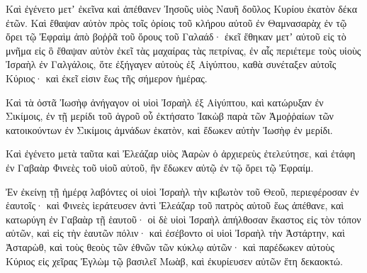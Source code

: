 {\par }{\PP {}Καὶ ἐγένετο μετʼ ἐκεῖνα καὶ ἀπέθανεν Ἰησοῦς υἱὸς Ναυῆ δοῦλος Κυρίου ἐκατὸν δέκα ἐτῶν.
Καὶ ἔθαψαν αὐτὸν πρὸς τοῖς ὁρίοις τοῦ κλήρου αὐτοῦ ἐν Θαμνασαρὰχ ἐν τῷ ὄρει τῷ Ἐφραὶμ ἀπὸ βοῤῥᾶ τοῦ ὄρους τοῦ Γαλαάδ·
ἐκεῖ ἔθηκαν μετʼ αὐτοῦ εἰς τὸ μνῆμα εἰς ὃ ἔθαψαν αὐτὸν ἐκεῖ τὰς μαχαίρας τὰς πετρίνας, ἐν αἷς περιέτεμε τοὺς υἱοὺς Ἰσραὴλ ἐν Γαλγάλοις, ὅτε ἐξήγαγεν αὐτοὺς ἐξ Αἰγύπτου, καθὰ συνέταξεν αὐτοῖς Κύριος· καὶ ἐκεῖ εἰσιν ἕως τῆς σήμερον ἡμέρας.
\par }{\PP {}Καὶ τὰ ὀστᾶ Ἰωσὴφ ἀνήγαγον οἱ υἱοὶ Ἰσραὴλ ἐξ Αἰγύπτου, καὶ κατώρυξαν ἐν Σικίμοις, ἐν τῇ μερίδι τοῦ ἀγροῦ οὗ ἐκτήσατο Ἰακὼβ παρὰ τῶν Ἀμοῤῥαίων τῶν κατοικούντων ἐν Σικίμοις ἀμνάδων ἑκατὸν, καὶ ἔδωκεν αὐτὴν Ἰωσὴφ ἐν μερίδι.
\par }{\PP {}Καὶ ἐγένετο μετὰ ταῦτα καὶ Ἐλεάζαρ υἱὸς Ἀαρὼν ὁ ἀρχιερεὺς ἐτελεύτησε, καὶ ἐτάφη ἐν Γαβαὰρ Φινεὲς τοῦ υἱοῦ αὐτοῦ, ἣν ἔδωκεν αὐτῷ ἐν τῷ ὄρει τῷ Ἐφραίμ.
\par }{\PP {}Ἐν ἐκείνῃ τῇ ἡμέρᾳ λαβόντες οἱ υἱοὶ Ἰσραὴλ τὴν κιβωτὸν τοῦ Θεοῦ, περιεφέροσαν ἐν ἑαυτοῖς· καὶ Φινεὲς ἱεράτευσεν ἀντὶ Ἐλεάζαρ τοῦ πατρὸς αὐτοῦ ἕως ἀπέθανε, καὶ κατωρύγη ἐν Γαβαὰρ τῇ ἑαυτοῦ·
οἱ δὲ υἱοὶ Ἰσραὴλ ἀπήλθοσαν ἕκαστος εἰς τὸν τόπον αὐτῶν, καὶ εἰς τὴν ἑαυτῶν πόλιν· καὶ ἐσέβοντο οἱ υἱοὶ Ἰσραὴλ τὴν Ἀστάρτην, καὶ Ἀσταρὼθ, καὶ τοὺς θεοὺς τῶν ἐθνῶν τῶν κύκλῳ αὐτῶν· καὶ παρέδωκεν αὐτοὺς Κύριος εἰς χεῖρας Ἐγλὼμ τῷ βασιλεῖ Μωὰβ, καὶ ἐκυρίευσεν αὐτῶν ἔτη δεκαοκτώ.
\par }